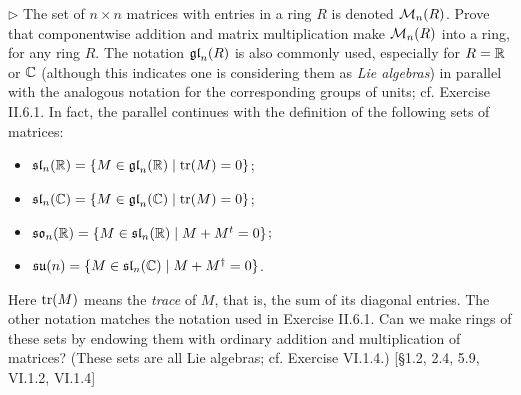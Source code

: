 \begin{problem}
	$\triangleright$ The set of $n \times n$ matrices with entries in a ring $R$ is denoted $\mathcal{M}_n(R)$. Prove that componentwise addition and matrix multiplication make $\mathcal{M}_n(R)$ into a ring, for any ring $R$. The notation $\mathfrak{gl}_n(R)$ is also commonly used, especially for $R = \mathbb{R}$ or $\mathbb{C}$ (although this indicates one is considering them as \emph{Lie algebras}) in parallel with the analogous notation for the corresponding groups of units; cf. Exercise II.6.1. In fact, the parallel continues with the definition of the following sets of matrices:
	\begin{itemize}
		\item $\mathfrak{sl}_n(\mathbb{R}) = \{ M \in \mathfrak{gl}_n(\mathbb{R}) \mid \operatorname{tr}(M) = 0 \}$;
		\item $\mathfrak{sl}_n(\mathbb{C}) = \{ M \in \mathfrak{gl}_n(\mathbb{C}) \mid \operatorname{tr}(M) = 0 \}$;
		\item $\mathfrak{so}_n(\mathbb{R}) = \{ M \in \mathfrak{sl}_n(\mathbb{R}) \mid M + M^t = 0 \}$;
		\item $\mathfrak{su}(n) = \{ M \in \mathfrak{sl}_n(\mathbb{C}) \mid M + M^{\dagger} = 0 \}$.
	\end{itemize}
	Here $\operatorname{tr}(M)$ means the \emph{trace} of $M$, that is, the sum of its diagonal entries. The other notation matches the notation used in Exercise II.6.1. Can we make rings of these sets by endowing them with ordinary addition and multiplication of matrices? (These sets are all Lie algebras; cf. Exercise VI.1.4.) [\S 1.2, 2.4, 5.9, VI.1.2, VI.1.4]
\end{problem}

